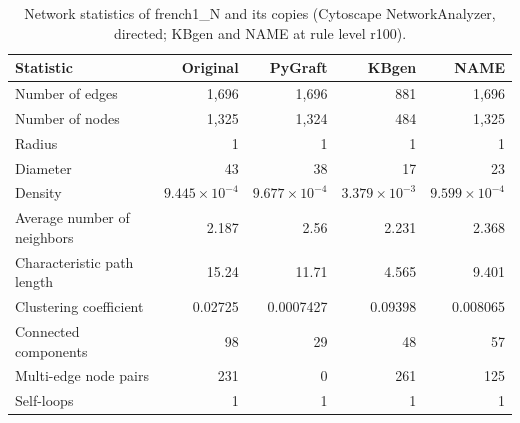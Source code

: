 \begin{table}[t]
\centering
\caption{Network statistics of french1\_N and its copies (Cytoscape NetworkAnalyzer, directed; KBgen and NAME at rule level r100).}
\label{tab:cytoscape_french1_N}
\begin{tabular}{lrrrr}
\toprule
Statistic & Original & PyGraft & KBgen & NAME \\
\midrule
Number of edges & 1{,}696 & 1{,}696 & 881 & 1{,}696 \\
Number of nodes & 1{,}325 & 1{,}324 & 484 & 1{,}325 \\
Radius & 1 & 1 & 1 & 1 \\
Diameter & 43 & 38 & 17 & 23 \\
Density & $9.445\times10^{-4}$ & $9.677\times10^{-4}$ & $3.379\times10^{-3}$ & $9.599\times10^{-4}$ \\
Average number of neighbors & 2.187 & 2.56 & 2.231 & 2.368 \\
Characteristic path length & 15.24 & 11.71 & 4.565 & 9.401 \\
Clustering coefficient & 0.02725 & 0.0007427 & 0.09398 & 0.008065 \\
Connected components & 98 & 29 & 48 & 57 \\
Multi-edge node pairs & 231 & 0 & 261 & 125 \\
Self-loops & 1 & 1 & 1 & 1 \\
\bottomrule
\end{tabular}
\end{table}
